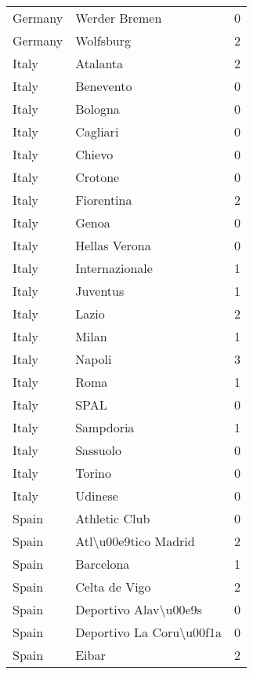 \begin{tabular}{llr}
Germany &             Werder Bremen &        0 \\
Germany &                 Wolfsburg &        2 \\
Italy   &                  Atalanta &        2 \\
Italy   &                 Benevento &        0 \\
Italy   &                   Bologna &        0 \\
Italy   &                  Cagliari &        0 \\
Italy   &                    Chievo &        0 \\
Italy   &                   Crotone &        0 \\
Italy   &                Fiorentina &        2 \\
Italy   &                     Genoa &        0 \\
Italy   &             Hellas Verona &        0 \\
Italy   &            Internazionale &        1 \\
Italy   &                  Juventus &        1 \\
Italy   &                     Lazio &        2 \\
Italy   &                     Milan &        1 \\
Italy   &                    Napoli &        3 \\
Italy   &                      Roma &        1 \\
Italy   &                      SPAL &        0 \\
Italy   &                 Sampdoria &        1 \\
Italy   &                  Sassuolo &        0 \\
Italy   &                    Torino &        0 \\
Italy   &                   Udinese &        0 \\
Spain   &             Athletic Club &        0 \\
Spain   &      Atl\textbackslash u00e9tico Madrid &        2 \\
Spain   &                 Barcelona &        1 \\
Spain   &             Celta de Vigo &        2 \\
Spain   &     Deportivo Alav\textbackslash u00e9s &        0 \\
Spain   &  Deportivo La Coru\textbackslash u00f1a &        0 \\
Spain   &                     Eibar &        2 \\

\end{tabular}
